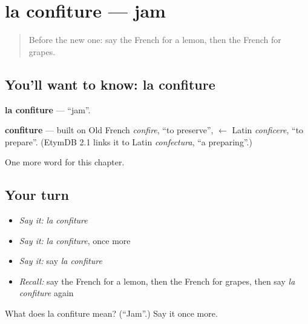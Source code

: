 \section[la confiture]{la confiture — jam}

\label{lesson:FR-C71-confiture}



\begin{quote}
Before the new one: say the French for a lemon, then the French for grapes.
\end{quote}

\subsection*{You'll want to know: la confiture}
\textbf{la confiture} — \textquotedblleft{}jam\textquotedblright{}.

\begin{cousinweb}
\textbf{confiture} — built on Old French \emph{confire}, \textquotedblleft{}to preserve\textquotedblright{}, $\leftarrow$ Latin \emph{conficere}, \textquotedblleft{}to prepare\textquotedblright{}. (EtymDB 2.1 links it to Latin \emph{confectura}, \textquotedblleft{}a preparing\textquotedblright{}.)
\end{cousinweb}

\begin{grammarlens}[title={What you've built}]
One more word for this chapter.
\end{grammarlens}

\subsection*{Your turn}
\begin{itemize}
\raggedright
  \item \emph{Say it:} \emph{la confiture}
  \item \emph{Say it:} \emph{la confiture}, once more
  \item \emph{Say it:} say \emph{la confiture}
  \item \emph{Recall:} say the French for a lemon, then the French for grapes, then say \emph{la confiture} again
\end{itemize}

\begin{tcolorbox}[breakable,colback=teal!4,colframe=teal!35!black,title={Before you move on}]
What does la confiture mean? (\textquotedblleft{}Jam\textquotedblright{}.) Say it once more.
\end{tcolorbox}
